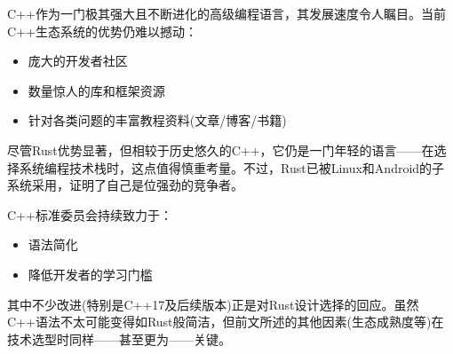 C++作为一门极其强大且不断进化的高级编程语言，其发展速度令人瞩目。当前C++生态系统的优势仍难以撼动：

\begin{itemize}
\item 
庞大的开发者社区

\item 
数量惊人的库和框架资源

\item 
针对各类问题的丰富教程资料(文章/博客/书籍)
\end{itemize}

尽管Rust优势显著，但相较于历史悠久的C++，它仍是一门年轻的语言——在选择系统编程技术栈时，这点值得慎重考量。不过，Rust已被Linux和Android的子系统采用，证明了自己是位强劲的竞争者。

C++标准委员会持续致力于：

\begin{itemize}
\item 
语法简化

\item 
降低开发者的学习门槛
\end{itemize}

其中不少改进(特别是C++17及后续版本)正是对Rust设计选择的回应。虽然C++语法不太可能变得如Rust般简洁，但前文所述的其他因素(生态成熟度等)在技术选型时同样——甚至更为——关键。